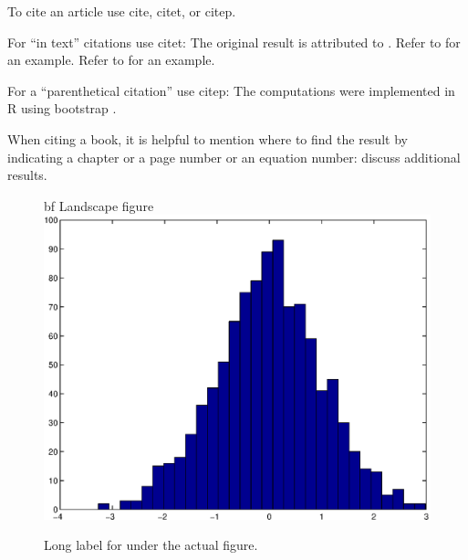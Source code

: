 
To cite an article use cite, citet, or citep.

For ``in text'' citations use citet:  The original result is attributed to \citet{vn28}.
Refer to \citet{mardia70} for an example.
Refer to \cite{mardia70} for an example.

For a ``parenthetical citation'' use citep:  The computations were implemented in R \citep{R}
using bootstrap \citep{dh97,et93}.

When citing a book, it is helpful to mention where to find the result by indicating
a chapter or a page number or an equation number:  \citet[Ch.~6]{et93} discuss additional results.




\begin{figure}
\centering
{bf Landscape figure}
\includegraphics[width=\hsize-1in]{figure.eps}
\caption[Short label for List of Figures]{ 
Long label for under the actual figure.}
\end{figure}



